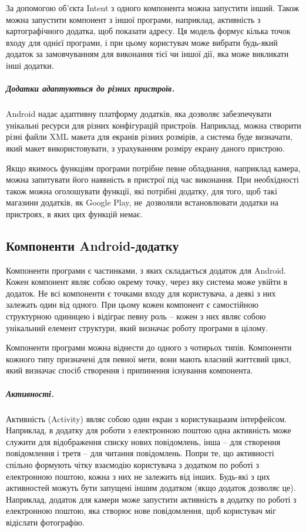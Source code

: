 \documentclass[../main.tex]{subfiles}
\begin{document}
За допомогою об'єкта Intent з одного компонента можна запустити інший. Також можна запустити компонент з іншої програми, наприклад, активність з картографічного додатка, щоб показати адресу. Ця модель формує кілька точок входу для однієї програми, і при цьому користувач може вибрати будь-який додаток за замовчуванням для виконання тієї чи іншої дії, яка може викликати інші додатки.
	
\subparagraph{Додатки адаптуються до різних пристроїв.}
Android надає адаптивну платформу додатків, яка дозволяє забезпечувати унікальні ресурси для різних конфігурацій пристроїв. Наприклад, можна створити різні файли XML макета для екранів різних розмірів, а система буде визначати, який макет використовувати, з урахуванням розміру екрану даного пристрою.

Якщо якимось функціям програми потрібне певне обладнання, наприклад камера, можна запитувати його наявність в пристрої під час виконання. При необхідності також можна оголошувати функції, які потрібні додатку, для того, щоб такі магазини додатків, як Google Play, не~дозволяли встановлювати додатки на пристроях, в яких цих функцій немає.

\subsection{Компоненти Android-додатку}

Компоненти програми є частинками, з яких складається додаток для Android. Кожен компонент являє собою окрему точку, через яку система може увійти в додаток. Не всі компоненти є точками входу для користувача, а деякі з них залежать один від одного. При цьому кожен компонент є самостійною структурною одиницею і відіграє певну роль -- кожен з них являє собою унікальний елемент структури, який визначає роботу програми в цілому.

Компоненти програми можна віднести до одного з чотирьох типів. Компоненти кожного типу призначені для певної мети, вони мають власний життєвий цикл, який визначає спосіб створення і припинення існування компонента.

\subparagraph{Активності.}
Активність (Activity) являє собою один екран з користувацьким інтерфейсом. Наприклад, в додатку для роботи з електронною поштою одна активність може служити для відображення списку нових повідомлень, інша -- для створення повідомлення і третя -- для читання повідомлень. Попри те, що активності спільно формують чітку взаємодію користувача з додатком по роботі з електронною поштою, кожна з них не залежить від інших. Будь-які з цих активностей можуть бути запущені іншим додатком (якщо додаток дозволяє це). Наприклад, додаток для камери може запустити активність в додатку по роботі з електронною поштою, яка створює нове повідомлення, щоб користувач міг відіслати фотографію.
\end{document}
